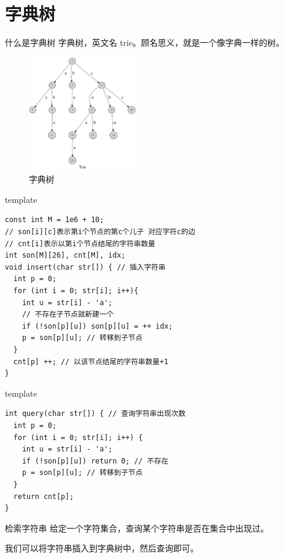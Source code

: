 \documentclass{ldr-simple-gray}
\begin{document}
  \section{字典树}
  \begin{frame}{什么是字典树}
    字典树，英文名 trie。顾名思义，就是一个像字典一样的树。
    \begin{figure}
      \centering
      \includegraphics[height=5cm]{./images/trie1.png}
      \caption{字典树}
    \end{figure}
  \end{frame}

  \begin{frame}[fragile]{template}
    \begin{verbatim}
const int M = 1e6 + 10;
// son[i][c]表示第i个节点的第c个儿子 对应字符c的边
// cnt[i]表示以第i个节点结尾的字符串数量
int son[M][26], cnt[M], idx;
void insert(char str[]) { // 插入字符串
  int p = 0;
  for (int i = 0; str[i]; i++){
    int u = str[i] - 'a';
    // 不存在子节点就新建一个
    if (!son[p][u]) son[p][u] = ++ idx;
    p = son[p][u]; // 转移到子节点
  }
  cnt[p] ++; // 以该节点结尾的字符串数量+1
}\end{verbatim}
  \end{frame}

  \begin{frame}[fragile]{template}
    \begin{verbatim}
int query(char str[]) { // 查询字符串出现次数
  int p = 0;
  for (int i = 0; str[i]; i++) {
    int u = str[i] - 'a';
    if (!son[p][u]) return 0; // 不存在
    p = son[p][u]; // 转移到子节点
  }
  return cnt[p];
}\end{verbatim}
  \end{frame}

  \begin{frame}{检索字符串}
    给定一个字符集合，查询某个字符串是否在集合中出现过。\newline

    我们可以将字符串插入到字典树中，然后查询即可。
  \end{frame}
\end{document}
